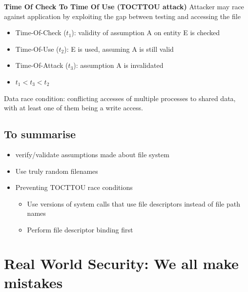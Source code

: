 \documentclass{article}
\begin{document}
\textbf{Time Of Check To Time Of Use (TOCTTOU attack)}
Attacker may race against application by exploiting the gap between testing and accessing the file
\begin{itemize}
    \item Time-Of-Check ($t_1$): validity of assumption A on entity E is checked
    \item Time-Of-Use ($t_2$): E is used, assuming A is still valid
    \item Time-Of-Attack ($t_3$): assumption A is invalidated
    \item $t_1 < t_3 < t_2$
\end{itemize}
Data race condition: conflicting accesses of multiple processes to shared data, with at least one of them being a write access.

\subsection{To summarise}
\begin{itemize}
    \item verify/validate assumptions made about file system
    \item Use truly random filenames
    \item Preventing TOCTTOU race conditions
    \begin{itemize}
        \item Use versions of system calls that use file descriptors instead of file path names
        \item Perform file descriptor binding first
    \end{itemize}
\end{itemize}

\section{Real World Security: We all make mistakes}
\end{document}
